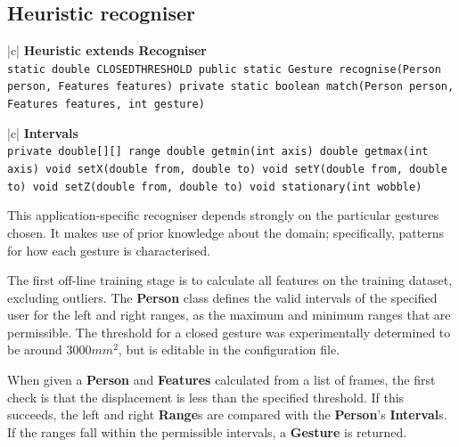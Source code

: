 \documentclass[12pt,a4,notitlepage]{report}
\renewcommand{\_}{\texttt{\symbol{95}}}
\newcommand{\<}{\texttt{\symbol{60}}}
\renewcommand{\>}{\texttt{\symbol{62}}}
\newcommand{\class}[1]{\textbf{#1}}
\newcommand{\variable}[1]{\texttt{#1}}
\begin{document}
\subsection{Heuristic recogniser}

\begin{tabular}{|c|} \hline 
\class{Heuristic extends Recogniser} \\ \hline
{}
{\variable{static double CLOSED\_THRESHOLD \newline
public static Gesture recognise(Person person, Features features) \newline
private static boolean match(Person person, Features features, int gesture)
} } \\ \hline
\end{tabular}

\begin{tabular}{|c|} \hline 
\class{Intervals} \\ \hline
{}
{\variable{private double[][] range \newline
  double get\_min(int axis) \newline
  double get\_max(int axis) \newline
  void setX(double from, double to) \newline
  void setY(double from, double to) \newline
  void setZ(double from, double to) \newline
  void stationary(int wobble)
} } \\ \hline
\end{tabular}

This application-specific recogniser depends strongly on the particular gestures chosen. It makes use of prior knowledge about the domain; specifically, patterns for how each gesture is characterised.

The first off-line training stage is to calculate all features on the training dataset, excluding outliers. The \class{Person} class defines the valid intervals of the specified user for the left and right ranges, as the maximum and minimum ranges that are permissible. The threshold for a closed gesture was experimentally determined to be around 3000$mm^2$, but is editable in the configuration file.

When given a \class{Person} and \class{Features} calculated from a list of frames, the first check is that the displacement is less than the specified threshold. If this succeeds, the left and right \class{Range}s are compared with the \class{Person}'s \class{Interval}s. If the ranges fall within the permissible intervals, a \class{Gesture} is returned.
\end{document}
